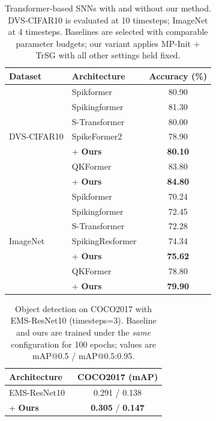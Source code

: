 \begin{table}[h]
\centering
\small
\begin{tabular}{llc}
\toprule
\textbf{Dataset} & \textbf{Architecture} & \textbf{Accuracy (\%)} \\
\midrule
\multirow{7}{*}{DVS-CIFAR10} 
& Spikformer~\cite{zhou2023spikformer} & 80.90 \\
& Spikingformer~\cite{zhou2023spikingformer} & 81.30 \\
& S-Transformer~\cite{yao2023stransformer} & 80.00 \\
& SpikeFormer2~\cite{zhou:2024} & 78.90 \\
& \quad + \textbf{Ours} & \textbf{80.10} \\
& QKFormer~\cite{zhou:2024_2} & 83.80 \\
& \quad + \textbf{Ours} & \textbf{84.80} \\
\midrule
\multirow{7}{*}{ImageNet}
& Spikformer~\cite{zhou2023spikformer} & 70.24 \\
& Spikingformer~\cite{zhou2023spikingformer} & 72.45 \\
& S-Transformer~\cite{yao2023stransformer} & 72.28 \\
& SpikingResformer~\cite{shi:2024} & 74.34 \\
& \quad + \textbf{Ours} & \textbf{75.62} \\
& QKFormer~\cite{zhou:2024_2} & 78.80 \\
& \quad + \textbf{Ours} & \textbf{79.90} \\
\bottomrule
\end{tabular}
\caption{Transformer-based SNNs with and without our method. 
DVS-CIFAR10 is evaluated at 10 timesteps; ImageNet at 4 timesteps. 
Baselines are selected with comparable parameter budgets; our variant applies MP-Init + TrSG with all other settings held fixed.}
\label{tab:advanced_snn}
\end{table}


\begin{table}[h]
\centering
\small
\begin{tabular}{lc}
\toprule
\textbf{Architecture} & \textbf{COCO2017 (mAP)} \\
\midrule
EMS-ResNet10~\cite{su:2023} & 0.291 / 0.138 \\
\quad + \textbf{Ours} & \textbf{0.305} / \textbf{0.147} \\
\bottomrule
\end{tabular}
\caption{Object detection on COCO2017 with EMS-ResNet10 (timesteps=3). 
Baseline and ours are trained under the \emph{same} configuration for 100 epochs; values are mAP@0.5 / mAP@0.5:0.95.}
\label{tab:object_detection}
\end{table}


